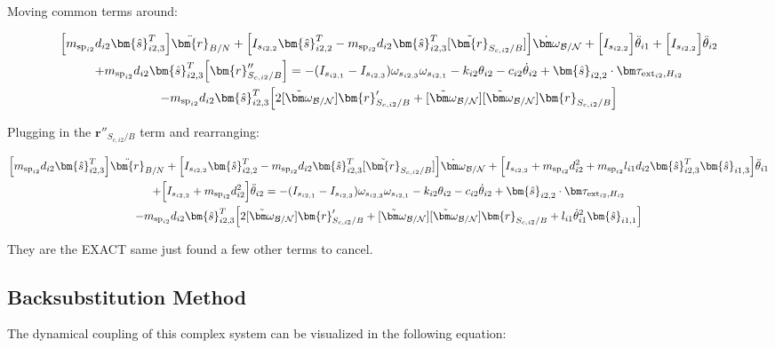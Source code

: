 Moving common terms around:

\begin{multline}
	\Big[m_{\text{sp}_{i2}} d_{i2}\bm{\hat{s}}_{i2,3}^T\Big] \ddot{\bm{r}}_{B/N} + \Big[I_{s_{i2,2}} \bm{\hat{s}}_{i2,2}^T - m_{\text{sp}_{i2}} d_{i2}\bm{\hat{s}}_{i2,3}^T  [\tilde{\bm{r}}_{S_{c,i2}/B}] \Big] \dot{\bm \omega}_{\cal{B/N}} + \Big[I_{s_{i2,2}}\Big] \ddot{\theta}_{i1}  + \Big[I_{s_{i2,2}}\Big] \ddot{\theta}_{i2} \\+ m_{\text{sp}_{i2}} d_{i2}\bm{\hat{s}}_{i2,3}^T \Big[ \bm{r}''_{S_{c,i2}/B}\Big]
	= - (I_{s_{i2,1}} - I_{s_{i2,3}}) \omega_{s_{i2,3}} \omega_{s_{i2,1}} -k_{i2} \theta_{i2} - c_{i2} \dot{\theta}_{i2}
	+ \bm{\hat{s}}_{i2,2} \cdot \bm \tau_{\text{ext}_{i2},H_{i2}} \\
	- m_{\text{sp}_{i2}} d_{i2}\bm{\hat{s}}_{i2,3}^T \Big[ 2 [\tilde{\bm\omega}_{\cal B/N}] \bm{r}'_{S_{c,i2}/B}
	+ [\tilde{\bm\omega}_{\cal B/N}] [\tilde{\bm\omega}_{\cal B/N}] \bm{r}_{S_{c,i2}/B}\Big]
\end{multline}

Plugging in the $\bm{r}''_{S_{c,i2}/B}$ term and rearranging:

\begin{multline}
	\Big[m_{\text{sp}_{i2}} d_{i2}\bm{\hat{s}}_{i2,3}^T\Big] \ddot{\bm{r}}_{B/N} + \Big[I_{s_{i2,2}} \bm{\hat{s}}_{i2,2}^T - m_{\text{sp}_{i2}} d_{i2}\bm{\hat{s}}_{i2,3}^T  [\tilde{\bm{r}}_{S_{c,i2}/B}] \Big] \dot{\bm \omega}_{\cal{B/N}} + \Big[I_{s_{i2,2}}+ m_{\text{sp}_{i2}} d_{i2}^2 + m_{\text{sp}_{i2}} l_{i1} d_{i2} \bm{\hat{s}}_{i2,3}^T \bm{\hat{s}}_{i1,3} \Big] \ddot{\theta}_{i1}  \\
	+ \Big[I_{s_{i2,2}} + m_{\text{sp}_{i2}} d_{i2}^2 \Big] \ddot{\theta}_{i2}
	= - (I_{s_{i2,1}} - I_{s_{i2,3}}) \omega_{s_{i2,3}} \omega_{s_{i2,1}} -k_{i2} \theta_{i2} - c_{i2} \dot{\theta}_{i2}
	+ \bm{\hat{s}}_{i2,2} \cdot \bm \tau_{\text{ext}_{i2},H_{i2}} \\
	- m_{\text{sp}_{i2}} d_{i2}\bm{\hat{s}}_{i2,3}^T \Big[ 2 [\tilde{\bm\omega}_{\cal B/N}] \bm{r}'_{S_{c,i2}/B}
	+ [\tilde{\bm\omega}_{\cal B/N}] [\tilde{\bm\omega}_{\cal B/N}] \bm{r}_{S_{c,i2}/B} + l_{i1} \dot{\theta}_{i1}^2 \bm{\hat{s}}_{i1,1}\Big]
\end{multline}

They are the EXACT same just found a few other terms to cancel.

\subsection{Backsubstitution Method}
The dynamical coupling of this complex system can be visualized in the following equation:

